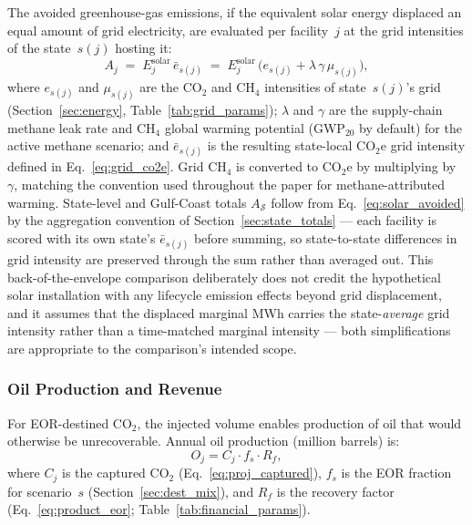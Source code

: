 \documentclass[11pt]{article}
\newcommand{\cotwo}{\ensuremath{\mathrm{CO_2}}}
\newcommand{\cotwoe}{\ensuremath{\mathrm{CO_{2}e}}}
\newcommand{\chfour}{\ensuremath{\mathrm{CH_4}}}
\begin{document}
The avoided greenhouse-gas emissions, if the equivalent solar energy displaced an equal amount of grid electricity, are evaluated per facility~$j$ at the grid intensities of the state~$s(j)$ hosting it:
%
\begin{equation}
  A_j \;=\; E_j^{\text{solar}} \,\bar{e}_{s(j)}
  \;=\; E_j^{\text{solar}} \,\bigl(e_{s(j)} + \lambda\,\gamma\,\mu_{s(j)}\bigr),
  \label{eq:solar_avoided}
\end{equation}
%
where $e_{s(j)}$ and $\mu_{s(j)}$ are the \cotwo{} and \chfour{} intensities of state~$s(j)$'s grid (Section~\ref{sec:energy}, Table~\ref{tab:grid_params}); $\lambda$ and $\gamma$ are the supply-chain methane leak rate and \chfour{} global warming potential (GWP$_{20}$ by default) for the active methane scenario; and $\bar{e}_{s(j)}$ is the resulting state-local \cotwoe{} grid intensity defined in Eq.~\eqref{eq:grid_co2e}. Grid \chfour{} is converted to \cotwoe{} by multiplying by $\gamma$, matching the convention used throughout the paper for methane-attributed warming. State-level and Gulf-Coast totals $A_{\mathcal{S}}$ follow from Eq.~\eqref{eq:solar_avoided} by the aggregation convention of Section~\ref{sec:state_totals} --- each facility is scored with its own state's $\bar{e}_{s(j)}$ before summing, so state-to-state differences in grid intensity are preserved through the sum rather than averaged out. This back-of-the-envelope comparison deliberately does not credit the hypothetical solar installation with any lifecycle emission effects beyond grid displacement, and it assumes that the displaced marginal MWh carries the state-\emph{average} grid intensity rather than a time-matched marginal intensity --- both simplifications are appropriate to the comparison's intended scope.

\subsubsection{Oil Production and Revenue}
\label{sec:oil}

For EOR-destined \cotwo{}, the injected volume enables production of oil that would otherwise be unrecoverable. Annual oil production (million barrels) is:
%
\begin{equation}
  O_j = C_j \cdot f_s \cdot R_f,
  \label{eq:oil_prod}
\end{equation}
%
where $C_j$ is the captured \cotwo{} (Eq.~\ref{eq:proj_captured}), $f_s$ is the EOR fraction for scenario~$s$ (Section~\ref{sec:dest_mix}), and $R_f$ is the recovery factor (Eq.~\ref{eq:product_eor}; Table~\ref{tab:financial_params}).
\end{document}
